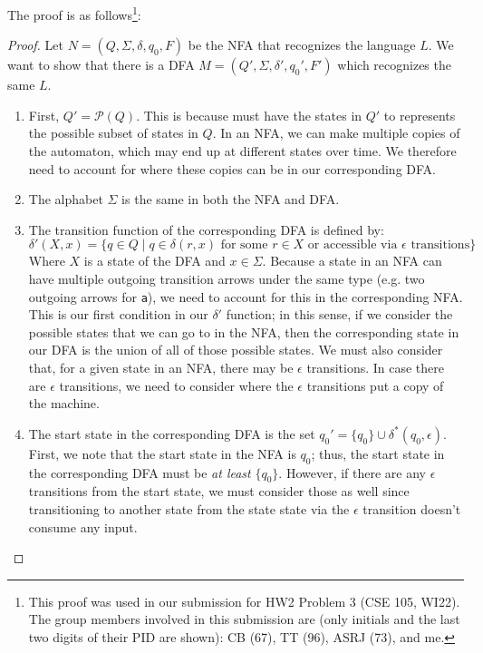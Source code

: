 \documentclass[letterpaper]{article}
\begin{document}
The proof is as follows\footnote{This proof was used in our submission for HW2 Problem 3 (CSE 105, WI22). The group members involved in this submission are (only initials and the last two digits of their PID are shown): CB (67), TT (96), ASRJ (73), and me.}:
\begin{mdframed}[]
    \begin{proof}
        Let $N = (Q, \Sigma, \delta, q_0, F)$ be the NFA that recognizes the language $L$. We want to show that there is a DFA $M = (Q', \Sigma, \delta', q_0', F')$ which recognizes the same $L$. 
        \begin{enumerate}
            \item First, $Q' = \mathcal{P}(Q)$. This is because must have the states in $Q'$ to represents the possible subset of states in $Q$. In an NFA, we can make multiple copies of the automaton, which may end up at different states over time. We therefore need to account for where these copies can be in our corresponding DFA. 
 
            \item The alphabet $\Sigma$ is the same in both the NFA and DFA. 
 
            \item The transition function of the corresponding DFA is defined by: 
            \[\delta'(X, x) = \{q \in Q \mid q \in \delta(r, x) \text{ for some } r \in X \text{ or accessible via } \epsilon \text{ transitions}\}\]
            Where $X$ is a state of the DFA and $x \in \Sigma$. Because a state in an NFA can have multiple outgoing transition arrows under the same type (e.g. two outgoing arrows for \texttt{a}), we need to account for this in the corresponding NFA. This is our first condition in our $\delta'$ function; in this sense, if we consider the possible states that we can go to in the NFA, then the corresponding state in our DFA is the union of all of those possible states. 
            We must also consider that, for a given state in an NFA, there may be $\epsilon$ transitions. In case there are $\epsilon$ transitions, we need to consider where the $\epsilon$ transitions put a copy of the machine.

            \item The start state in the corresponding DFA is the set $q_0' = \{q_0\} \cup \delta^{*} (q_0, \epsilon)$. First, we note that the start state in the NFA is $q_0$; thus, the start state in the corresponding DFA must be \emph{at least} $\{q_0\}$. However, if there are any $\epsilon$ transitions from the start state, we must consider those as well since transitioning to another state from the state state via the $\epsilon$ transition doesn't consume any input. 


\end{enumerate}
\end{proof}
\end{mdframed}
\end{document}

